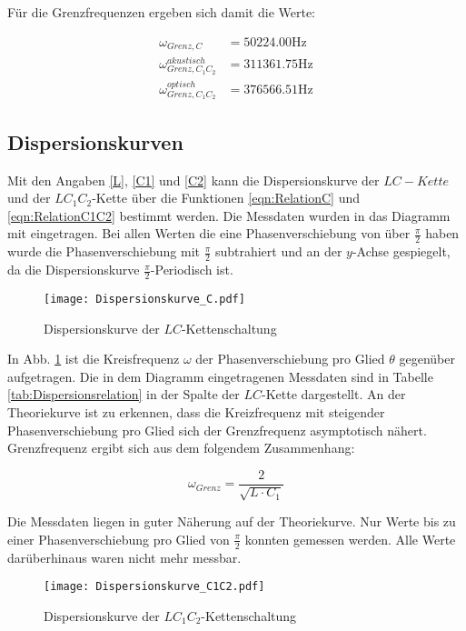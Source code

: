 Für die Grenzfrequenzen ergeben sich damit die Werte:

\begin{align}
  \omega_{Grenz,C} &= \num{50224,00}\si{\hertz}\\
  \omega_{Grenz,C_1C_2}^{akustisch} &= \num{311361,75}\si{\hertz}\\
  \omega_{Grenz,C_1C_2}^{optisch} &= \num{376566,51}\si{\hertz}
\end{align}

\subsection{Dispersionskurven}

Mit den Angaben \eqref{L}, \eqref{C1} und \eqref{C2} kann die Dispersionskurve
der $LC-Kette$ und der $LC_1C_2$-Kette über die Funktionen \eqref{eqn:RelationC}
und \eqref{eqn:RelationC1C2} bestimmt werden.
Die Messdaten wurden in das Diagramm mit eingetragen. Bei allen Werten die eine
Phasenverschiebung von über $\frac{\pi}{2}$ haben wurde die Phasenverschiebung
mit $\frac{\pi}{2}$ subtrahiert und an der $y$-Achse gespiegelt,
da die Dispersionskurve $\frac{\pi}{2}$-Periodisch ist.

\begin{figure}
  \texttt{[image: Dispersionskurve\_C.pdf]}
  \caption{Dispersionskurve der $LC$-Kettenschaltung}
  \label{fig:DispersionC}
\end{figure}

In Abb. \ref{fig:DispersionC} ist die Kreisfrequenz $\omega$ der Phasenverschiebung
pro Glied $\theta$ gegenüber aufgetragen. Die in dem Diagramm eingetragenen
Messdaten sind in Tabelle \ref{tab:Dispersionsrelation} in der Spalte
der $LC$-Kette dargestellt. An der Theoriekurve ist zu erkennen, dass die Kreizfrequenz
mit steigender Phasenverschiebung pro Glied sich der Grenzfrequenz asymptotisch
nähert. Grenzfrequenz ergibt sich aus dem folgendem Zusammenhang:

\begin{equation}
  \label{eqn:Grenzfrequenz}
  \omega_{Grenz} = \frac{2}{\sqrt{L\cdot C_1}}
\end{equation}

Die Messdaten liegen in guter Näherung auf der Theoriekurve.
Nur Werte bis zu einer Phasenverschiebung pro Glied von $\frac{\pi}{2}$
konnten gemessen werden. Alle Werte darüberhinaus waren nicht mehr messbar.

\begin{figure}
  \texttt{[image: Dispersionskurve\_C1C2.pdf]}
  \caption{Dispersionskurve der $LC_1C_2$-Kettenschaltung}
  \label{fig:DispersionC1C2}
\end{figure}

